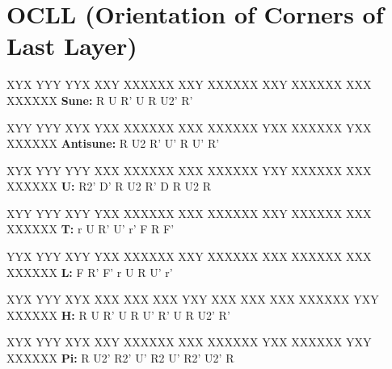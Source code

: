 \section{OCLL (Orientation of Corners of Last Layer)}

\begin{multicols}{2}

\RubikCubeGreyAll
\RubikFaceUp XYX YYY YYX
\RubikFaceFront XXY XXXXXX
\RubikFaceRight XXY XXXXXX
\RubikFaceBack XXY XXXXXX
\RubikFaceLeft XXX XXXXXX
	\noindent{}
\hspace{0.45cm}\textbf{Sune:} R U R' U R U2' R'
\vspace{0.2cm}

\RubikCubeGreyAll
\RubikFaceUp XYY YYY XYX
\RubikFaceFront YXX XXXXXX
\RubikFaceRight XXX XXXXXX
\RubikFaceBack YXX XXXXXX
\RubikFaceLeft YXX XXXXXX
	\noindent{}
\hspace{0.45cm}\textbf{Antisune:} R U2 R' U' R U' R'
\vspace{0.2cm}

\RubikCubeGreyAll
\RubikFaceUp XYX YYY YYY
\RubikFaceFront XXX XXXXXX
\RubikFaceRight XXX XXXXXX
\RubikFaceBack YXY XXXXXX
\RubikFaceLeft XXX XXXXXX
	\noindent{}
\hspace{0.45cm}\textbf{U:} R2' D' R U2 R' D R U2 R
\vspace{0.2cm}

\RubikCubeGreyAll
\RubikFaceUp XYY YYY XYY
\RubikFaceFront YXX XXXXXX
\RubikFaceRight XXX XXXXXX
\RubikFaceBack XXY XXXXXX
\RubikFaceLeft XXX XXXXXX
	\noindent{}
\hspace{0.45cm}\textbf{T:} r U R' U' r' F R F'
\vspace{0.2cm}

\RubikCubeGreyAll
\RubikFaceUp YYX YYY XYY
\RubikFaceFront YXX XXXXXX
\RubikFaceRight XXY XXXXXX
\RubikFaceBack XXX XXXXXX
\RubikFaceLeft XXX XXXXXX
	\noindent{}
\hspace{0.45cm}\textbf{L:} F R' F' r U R U' r'
\vspace{0.2cm}

\RubikCubeGreyAll
\RubikFaceUp XYX YYY XYX
\RubikFaceFront XXX XXX XXX
\RubikFaceRight YXY XXX XXX
\RubikFaceBack XXX XXXXXX
\RubikFaceLeft YXY XXXXXX
	\noindent{}
\hspace{0.45cm}\textbf{H:} R U R' U R U' R' U R U2' R'
\vspace{0.2cm}

\RubikCubeGreyAll
\RubikFaceUp XYX YYY XYX
\RubikFaceFront XXY XXXXXX
\RubikFaceRight XXX XXXXXX
\RubikFaceBack YXX XXXXXX
\RubikFaceLeft YXY XXXXXX
	\noindent{}
\hspace{0.2cm}\textbf{Pi:} R U2' R2' U' R2 U' R2' U2' R

\end{multicols}

